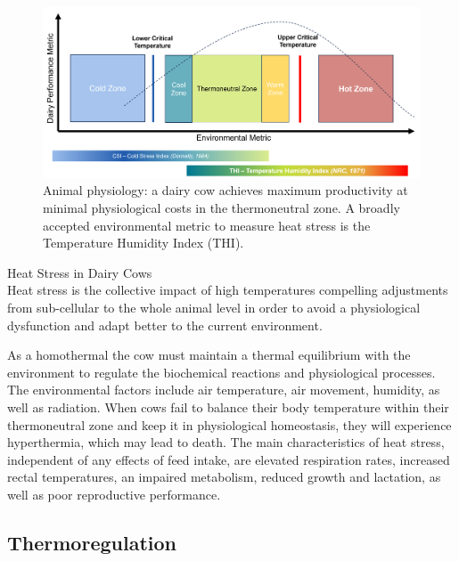 \begin{figure}[ht]
    \centering
    \includegraphics[width=\textwidth]{thesis/figures/physiology.png}
    \caption{Animal physiology: a dairy cow achieves maximum productivity at minimal physiological costs in the thermoneutral zone. A broadly accepted environmental metric to measure heat stress is the Temperature Humidity Index (THI).}
    \label{fig:ainmal_physiology}
\end{figure}

\vspace*{\baselineskip}
\begin{defi} Heat Stress in Dairy Cows \\
    Heat stress is the collective impact of high temperatures compelling adjustments from sub-cellular to the whole animal level in order to avoid a physiological dysfunction and adapt better to the current environment. 
\end{defi}

As a homothermal the cow must maintain a thermal equilibrium with the environment to regulate the biochemical reactions and physiological processes. The environmental factors include air temperature, air movement, humidity, as well as radiation. When cows fail to balance their body temperature within their thermoneutral zone and keep it in physiological homeostasis, they will experience hyperthermia, which may lead to death. The main characteristics of heat stress, independent of any effects of feed intake, are elevated respiration rates, increased rectal temperatures, an impaired metabolism, reduced growth and lactation, as well as poor reproductive performance.

\subsection{Thermoregulation}\label{sec:thermoregulation}
